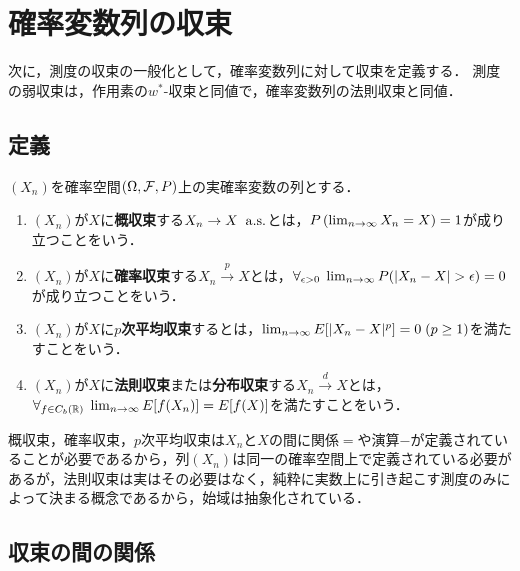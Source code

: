 \documentclass[uplatex,dvipdfmx]{jsreport}
\begin{document}
\section{確率変数列の収束}

\begin{tcolorbox}[colframe=ForestGreen, colback=ForestGreen!10!white,breakable,colbacktitle=ForestGreen!40!white,coltitle=black,fonttitle=\bfseries\sffamily,
title=]
    次に，測度の収束の一般化として，確率変数列に対して収束を定義する．
    測度の弱収束は，作用素の$w^*$-収束と同値で，確率変数列の法則収束と同値．
\end{tcolorbox}

\subsection{定義}

\begin{definition}
    $(X_n)$を確率空間$(\Omega,\mathcal{F},P)$上の実確率変数の列とする．
    \begin{enumerate}
        \item $(X_n)$が$X$に\textbf{概収束}する$X_n\to X\;\;\mathrm{a.s.}$とは，$P\left(\lim_{n\to\infty}X_n=X\right)=1$が成り立つことをいう．
        \item $(X_n)$が$X$に\textbf{確率収束}する$X_n\xrightarrow{p}X$とは，$\forall_{\epsilon>0}\;\lim_{n\to\infty}P(\lvert X_n-X\rvert>\epsilon)=0$が成り立つことをいう．
        \item $(X_n)$が$X$に\textbf{$p$次平均収束}するとは，$\lim_{n\to\infty}E[\lvert X_n-X\rvert^p]=0\;(p\ge 1)$を満たすことをいう．
        \item $(X_n)$が$X$に\textbf{法則収束}または\textbf{分布収束}する$X_n\xrightarrow{d}X$とは，$\forall_{f\in C_b(\mathbb{R})}\;\lim_{n\to\infty}E[f(X_n)]=E[f(X)]$を満たすことをいう．
    \end{enumerate}
\end{definition}
\begin{remark}
    概収束，確率収束，$p$次平均収束は$X_n$と$X$の間に関係$=$や演算$-$が定義されていることが必要であるから，列$(X_n)$は同一の確率空間上で定義されている必要があるが，法則収束は実はその必要はなく，純粋に実数上に引き起こす測度のみによって決まる概念であるから，始域は抽象化されている．
\end{remark}

\subsection{収束の間の関係}
\end{document}
